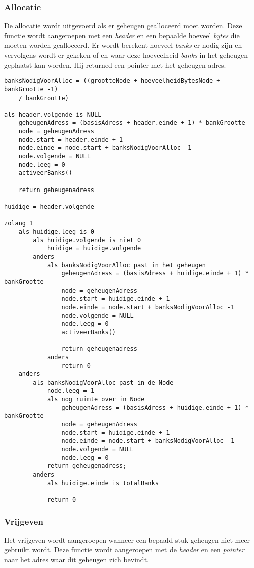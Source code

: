 \documentclass{uva-inf-article}
\begin{document}
\subsubsection{Allocatie}
De allocatie wordt uitgevoerd als er geheugen gealloceerd moet worden. Deze functie wordt
aangeroepen met een \textit{header} en een bepaalde hoeveel \textit{bytes} die moeten worden
gealloceerd. Er wordt berekent hoeveel \textit{banks} er nodig zijn en vervolgens
wordt er gekeken of en waar deze hoeveelheid \textit{banks} in het geheugen geplaatst kan worden.
Hij returned een pointer met het geheugen adres.
\begin{lstlisting}
banksNodigVoorAlloc = ((grootteNode + hoeveelheidBytesNode + bankGrootte -1)
    / bankGrootte)

als header.volgende is NULL
    geheugenAdress = (basisAdress + header.einde + 1) * bankGrootte
    node = geheugenAdress
    node.start = header.einde + 1
    node.einde = node.start + banksNodigVoorAlloc -1
    node.volgende = NULL
    node.leeg = 0
    activeerBanks()

    return geheugenadress

huidige = header.volgende

zolang 1
    als huidige.leeg is 0
        als huidige.volgende is niet 0
            huidige = huidige.volgende
        anders
            als banksNodigVoorAlloc past in het geheugen
                geheugenAdress = (basisAdress + huidige.einde + 1) * bankGrootte
                node = geheugenAdress
                node.start = huidige.einde + 1
                node.einde = node.start + banksNodigVoorAlloc -1
                node.volgende = NULL
                node.leeg = 0
                activeerBanks()

                return geheugenadress
            anders
                return 0
    anders
        als banksNodigVoorAlloc past in de Node
            node.leeg = 1
            als nog ruimte over in Node
                geheugenAdress = (basisAdress + huidige.einde + 1) * bankGrootte
                node = geheugenAdress
                node.start = huidige.einde + 1
                node.einde = node.start + banksNodigVoorAlloc -1
                node.volgende = NULL
                node.leeg = 0
            return geheugenadress;
        anders
            als huidige.einde is totalBanks

            return 0

\end{lstlisting}

\subsubsection{Vrijgeven}
Het vrijgeven wordt aangeroepen wanneer een bepaald stuk geheugen niet meer gebruikt
wordt. Deze functie wordt aangeroepen met de \textit{header} en een \textit{pointer}
naar het adres waar dit geheugen zich bevindt.
\end{document}
